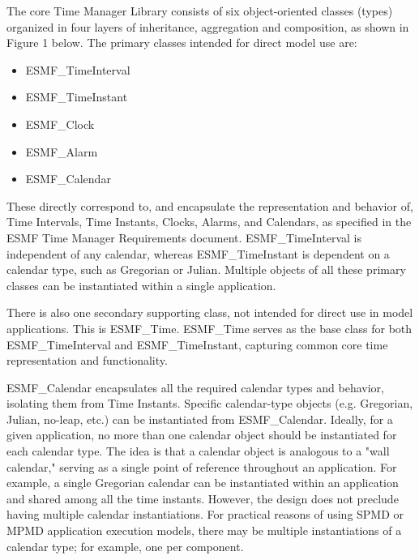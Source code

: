 

The core Time Manager Library consists of six object-oriented classes (types)
organized in four layers of inheritance, aggregation and composition,
as shown in Figure 1 below.  The primary classes intended for
direct model use are:

\begin{itemize}
\item ESMF\_TimeInterval
\item ESMF\_TimeInstant
\item ESMF\_Clock
\item ESMF\_Alarm
\item ESMF\_Calendar
\end{itemize}

These directly correspond to, and encapsulate the representation and
behavior of, Time Intervals, Time Instants, Clocks, Alarms, and Calendars,
as specified in the ESMF Time Manager Requirements document.
ESMF\_TimeInterval is independent of any calendar, whereas ESMF\_TimeInstant
is dependent on a calendar type, such as Gregorian or Julian.  Multiple
objects of all these primary classes can be instantiated within a single
application.

There is also one secondary supporting class, not intended for direct
use in model applications.  This is ESMF\_Time.  ESMF\_Time serves as the
base class for both ESMF\_TimeInterval and ESMF\_TimeInstant, capturing
common core time representation and functionality.

ESMF\_Calendar encapsulates all the required calendar types and behavior,
isolating them from Time Instants.  Specific calendar-type objects (e.g.
Gregorian, Julian, no-leap, etc.) can be instantiated from ESMF\_Calendar.
Ideally, for a given application, no more than one calendar
object should be instantiated for each calendar type.  The idea is that
a calendar object is analogous to a "wall calendar," serving as a single
point of reference throughout an application.  For example, a single
Gregorian calendar can be instantiated within an application and shared
among all the time instants.  However, the design does not preclude having
multiple calendar instantiations.  For practical reasons of using SPMD or
MPMD application execution models, there may be multiple instantiations
of a calendar type; for example, one per component.

